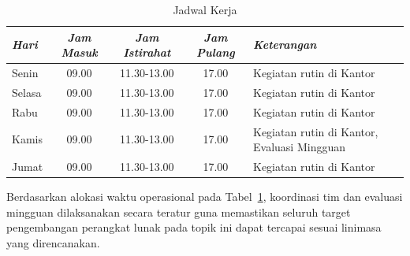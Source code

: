 \begin{table}[H]
  \centering
  \caption{Jadwal Kerja}
  \label{tab:jadwal-kerja}
  \begin{tabular}{|l|c|c|c|>{\raggedright\arraybackslash}p{4.7cm}|}
    \hline
    \textit{Hari} & \textit{Jam Masuk} & \textit{Jam Istirahat} & \textit{Jam Pulang} & \textit{Keterangan} \\
    \hline
    Senin  & 09.00 & 11.30-13.00 & 17.00 & Kegiatan rutin di Kantor \\ \hline
    Selasa & 09.00 & 11.30-13.00 & 17.00 & Kegiatan rutin di Kantor \\ \hline
    Rabu   & 09.00 & 11.30-13.00 & 17.00 & Kegiatan rutin di Kantor \\ \hline
    Kamis  & 09.00 & 11.30-13.00 & 17.00 & Kegiatan rutin di Kantor, Evaluasi Mingguan \\ \hline
    Jumat  & 09.00 & 11.30-13.00 & 17.00 & Kegiatan rutin di Kantor \\ \hline
  \end{tabular}
\end{table}

Berdasarkan alokasi waktu operasional pada Tabel~\ref{tab:jadwal-kerja}, koordinasi tim dan evaluasi mingguan dilaksanakan secara teratur guna memastikan seluruh target pengembangan perangkat lunak pada topik ini dapat tercapai sesuai linimasa yang direncanakan.
